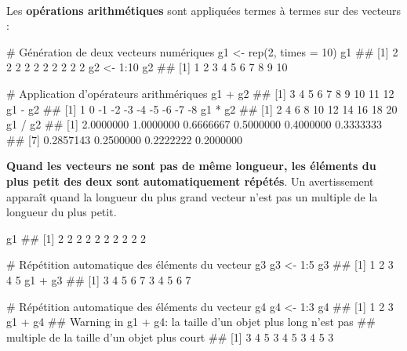 \documentclass[12pt,twosided, notitlepage]{book}
\newenvironment{Shaded}{}{}
\newcommand{\KeywordTok}[1]{\textcolor[rgb]{0.00,0.00,1.00}{#1}}
\newcommand{\DataTypeTok}[1]{#1}
\newcommand{\DecValTok}[1]{#1}
\newcommand{\StringTok}[1]{\textcolor[rgb]{0.00,0.50,0.50}{#1}}
\newcommand{\CommentTok}[1]{\textcolor[rgb]{0.00,0.50,0.00}{#1}}
\newcommand{\OperatorTok}[1]{#1}
\newcommand{\NormalTok}[1]{#1}
\renewenvironment{Shaded}{\begin{snugshade}}{\end{snugshade}}
\begin{document}
~

Les \textbf{opérations arithmétiques} sont appliquées termes à termes
sur des
vecteurs\index{\texttt{+}}\index{\texttt{-}}\index{\texttt{*}}\index{\texttt{/}}
:

\begin{Shaded}
\begin{Highlighting}[]
\CommentTok{# Génération de deux vecteurs numériques}
\NormalTok{g1 <-}\StringTok{ }\KeywordTok{rep}\NormalTok{(}\DecValTok{2}\NormalTok{, }\DataTypeTok{times =} \DecValTok{10}\NormalTok{)}
\NormalTok{g1}
\NormalTok{  ##  [1] 2 2 2 2 2 2 2 2 2 2}
\NormalTok{g2 <-}\StringTok{ }\DecValTok{1}\OperatorTok{:}\DecValTok{10}
\NormalTok{g2}
\NormalTok{  ##  [1]  1  2  3  4  5  6  7  8  9 10}

\CommentTok{# Application d'opérateurs arithmériques}
\NormalTok{g1 }\OperatorTok{+}\StringTok{ }\NormalTok{g2}
\NormalTok{  ##  [1]  3  4  5  6  7  8  9 10 11 12}
\NormalTok{g1 }\OperatorTok{-}\StringTok{ }\NormalTok{g2}
\NormalTok{  ##  [1]  1  0 -1 -2 -3 -4 -5 -6 -7 -8}
\NormalTok{g1 }\OperatorTok{*}\StringTok{ }\NormalTok{g2}
\NormalTok{  ##  [1]  2  4  6  8 10 12 14 16 18 20}
\NormalTok{g1 }\OperatorTok{/}\StringTok{ }\NormalTok{g2}
\NormalTok{  ##  [1] 2.0000000 1.0000000 0.6666667 0.5000000 0.4000000 0.3333333}
\NormalTok{  ##  [7] 0.2857143 0.2500000 0.2222222 0.2000000}
\end{Highlighting}
\end{Shaded}

\textbf{Quand les vecteurs ne sont pas de même longueur, les éléments du
plus petit des deux sont automatiquement répétés}. Un avertissement
apparaît quand la longueur du plus grand vecteur n'est pas un multiple
de la longueur du plus petit.

\begin{Shaded}
\begin{Highlighting}[]
\NormalTok{g1}
\NormalTok{  ##  [1] 2 2 2 2 2 2 2 2 2 2}

\CommentTok{# Répétition automatique des éléments du vecteur g3}
\NormalTok{g3 <-}\StringTok{ }\DecValTok{1}\OperatorTok{:}\DecValTok{5}
\NormalTok{g3}
\NormalTok{  ## [1] 1 2 3 4 5}
\NormalTok{g1 }\OperatorTok{+}\StringTok{ }\NormalTok{g3}
\NormalTok{  ##  [1] 3 4 5 6 7 3 4 5 6 7}

\CommentTok{# Répétition automatique des éléments du vecteur g4}
\NormalTok{g4 <-}\StringTok{ }\DecValTok{1}\OperatorTok{:}\DecValTok{3}
\NormalTok{g4}
\NormalTok{  ## [1] 1 2 3}
\NormalTok{g1 }\OperatorTok{+}\StringTok{ }\NormalTok{g4}
\NormalTok{  ## Warning in g1 + g4: la taille d'un objet plus long n'est pas}
\NormalTok{  ## multiple de la taille d'un objet plus court}
\NormalTok{  ##  [1] 3 4 5 3 4 5 3 4 5 3}
\end{Highlighting}
\end{Shaded}
\end{document}
